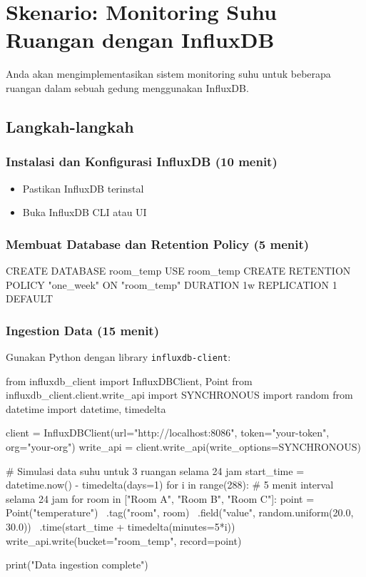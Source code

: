 \section{Skenario: Monitoring Suhu Ruangan dengan InfluxDB}
Anda akan mengimplementasikan sistem monitoring suhu untuk beberapa ruangan dalam sebuah gedung menggunakan InfluxDB.

\subsection{Langkah-langkah}

\subsubsection{Instalasi dan Konfigurasi InfluxDB (10 menit)}
\begin{itemize}
    \item Pastikan InfluxDB terinstal
    \item Buka InfluxDB CLI atau UI
\end{itemize}

\subsubsection{Membuat Database dan Retention Policy (5 menit)}
\begin{codebox}[language=SQL]
CREATE DATABASE room_temp
USE room_temp
CREATE RETENTION POLICY "one_week" ON "room_temp" DURATION 1w REPLICATION 1 DEFAULT
\end{codebox}

\subsubsection{Ingestion Data (15 menit)}
Gunakan Python dengan library \texttt{influxdb-client}:

\begin{codebox}[language=Python]
from influxdb_client import InfluxDBClient, Point
from influxdb_client.client.write_api import SYNCHRONOUS
import random
from datetime import datetime, timedelta

client = InfluxDBClient(url="http://localhost:8086", token="your-token", org="your-org")
write_api = client.write_api(write_options=SYNCHRONOUS)

# Simulasi data suhu untuk 3 ruangan selama 24 jam
start_time = datetime.now() - timedelta(days=1)
for i in range(288):  # 5 menit interval selama 24 jam
    for room in ["Room A", "Room B", "Room C"]:
        point = Point("temperature") \
            .tag("room", room) \
            .field("value", random.uniform(20.0, 30.0)) \
            .time(start_time + timedelta(minutes=5*i))
        write_api.write(bucket="room_temp", record=point)

print("Data ingestion complete")
\end{codebox}

